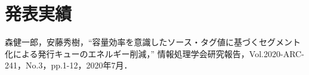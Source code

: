 
\chapter*{発表実績}
\noindent
  森健一郎，安藤秀樹，``容量効率を意識したソース・タグ値に基づくセグメント化による発行キューのエネルギー削減，'' 情報処理学会研究報告，Vol.2020-ARC-241，No.3，pp.1-12，2020年7月．

